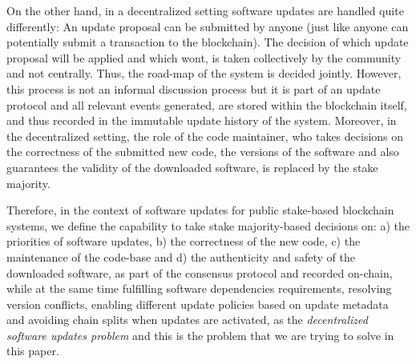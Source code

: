 On the other hand, in a decentralized setting software updates are handled quite differently: An update proposal can be submitted by anyone (just like anyone can potentially submit a transaction to the blockchain). The decision of which update proposal will be applied and which wont, is taken collectively by the community and not centrally. Thus, the road-map of the system is decided jointly. However, this process is not an informal discussion process but it is part of an update protocol and all relevant events generated, are stored within the blockchain itself, and thus recorded in the immutable update history of the system. Moreover, in the decentralized setting, the role of the code maintainer, who takes decisions on the correctness of the submitted new code, the versions of the software and also guarantees the validity of the downloaded software, is replaced by the stake majority. 

Therefore, in the context of software updates for public stake-based blockchain systems, we define the capability to take stake majority-based decisions on: a) the priorities of software updates, b) the correctness of the new code, c) the maintenance of the code-base and d) the authenticity and safety of the downloaded software, as part of the consensus protocol and recorded on-chain, while at the same time fulfilling software dependencies requirements, resolving version conflicts, enabling different update policies based on update metadata and avoiding chain splits when updates are activated, as the \emph{decentralized software updates problem} and this is the problem that we are trying to solve in this paper.




